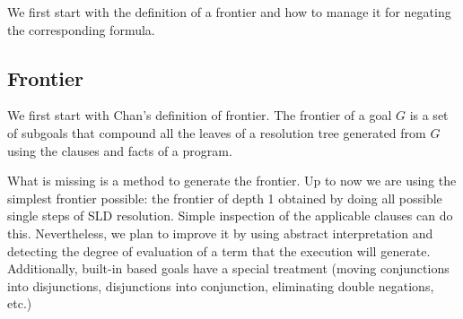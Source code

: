 \documentclass{llncs}
\begin{document}
We first start with the definition of a frontier and how to manage it for
negating the corresponding formula.


\subsection{Frontier}
\label{frontier}

We first start with Chan's definition of frontier. The frontier of a
goal $G$ is a set of subgoals that compound all the leaves of a
resolution tree generated from $G$ using the clauses and facts of a
program.


What is missing is a method to generate the frontier.  Up to now we
are using the simplest frontier possible: the frontier of depth 1
obtained by doing all possible single steps of SLD resolution. Simple
inspection of the applicable clauses can do this.  Nevertheless, we
plan to improve it by using abstract interpretation and
detecting the degree of evaluation of a term that the execution will
generate.
Additionally, built-in based goals have a special
treatment (moving conjunctions into disjunctions, disjunctions into
conjunction, eliminating double negations, etc.)
\end{document}
